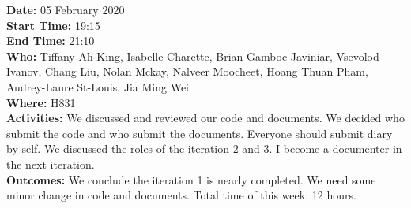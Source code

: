 \documentclass[12pt]{article}
\begin{document}
{\bf Date:} 05 February 2020\\
{\bf Start Time:} 19:15\\
{\bf End Time:}  21:10\\
{\bf Who:} Tiffany Ah King,
Isabelle Charette,
Brian Gamboc-Javiniar,
Vsevolod Ivanov,
Chang Liu,
Nolan Mckay,
Nalveer Moocheet,
Hoang Thuan Pham,
Audrey-Laure St-Louis,
Jia Ming Wei\\
{\bf Where:} H831 \\
{\bf Activities:}  We discussed and reviewed our code and documents. We decided who submit the code and who submit the documents. Everyone should submit diary by self. We discussed the roles of the iteration 2 and 3. I become a documenter in the next iteration. \\
{\bf Outcomes:} We conclude the iteration 1 is nearly completed. We need some minor change in code and documents. Total time of this week: 12 hours.\\


\end{document}
